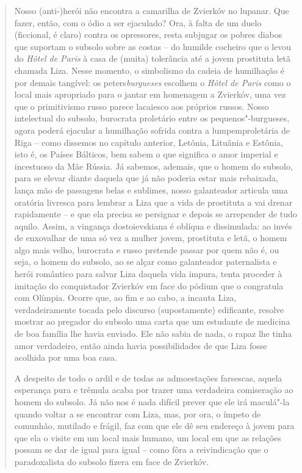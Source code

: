 {\begin{quote}
Nosso (anti-)herói não encontra a camarilha de Zvierkóv no lupanar. Que
fazer, então, com o ódio a ser ejaculado? Ora, à falta de um duelo
(ficcional, é claro) contra os opressores, resta subjugar os pobres
diabos que suportam o subsolo sobre as costas -- do humilde cocheiro que
o levou do \emph{Hôtel de Paris} à casa de (muita) tolerância até a
jovem prostituta letã chamada Liza. Nesse momento, o simbolismo da
cadeia de humilhação é por demais tangível: os peters\emph{burgueses}
escolhem o \emph{Hôtel de Paris} como o local mais apropriado para o
jantar em homenagem a Zvierkóv, uma vez que o primitivismo russo parece
lacaiesco aos próprios russos. Nosso intelectual do subsolo, burocrata
proletário entre os pequenos"-burgueses, agora poderá ejacular a
humilhação sofrida contra a lumpemproletária de Riga -- como dissemos no
capítulo anterior, Letônia, Lituânia e Estônia, isto é, os Países
Bálticos, bem sabem o que significa o amor imperial e incestuoso da Mãe
Rússia. Já sabemos, ademais, que o homem do subsolo, para se elevar
diante daquela que já não poderia estar mais rebaixada, lança mão de
passagens belas e sublimes, nosso galanteador articula uma oratória
livresca para lembrar a Liza que a vida de prostituta a vai drenar
rapidamente -- e que ela precisa se persignar e depois se arrepender de
tudo aquilo. Assim, a vingança dostoievskiana é oblíqua e dissimulada:
ao invés de enxovalhar de uma só vez a mulher jovem, prostituta e letã,
o homem algo mais velho, burocrata e russo pretende passar por quem não
é, ou seja, o homem do subsolo, ao se alçar como galanteador
paternalista e herói romântico para salvar Liza daquela vida impura,
tenta proceder à imitação do conquistador Zvierkóv em face do pódium que
o congratula com Olímpia. Ocorre que, ao fim e ao cabo, a incauta Liza,
verdadeiramente tocada pelo discurso (supostamente) edificante, resolve
mostrar ao pregador do subsolo uma carta que um estudante de medicina de
boa família lhe havia enviado. Ele não sabia de nada, o rapaz lhe tinha
amor verdadeiro, então ainda havia possibilidades de que Liza fosse
acolhida por uma boa casa.

A despeito de todo o ardil e de todas as admoestações farsescas, aquela
esperança pura e trêmula acaba por trazer uma verdadeira comiseração ao
homem do subsolo. Já não nos é nada difícil prever que ele irá maculá"-la
quando voltar a se encontrar com Liza, mas, por ora, o ímpeto de
comunhão, mutilado e frágil, faz com que ele dê seu endereço à jovem
para que ela o visite em um local mais humano, um local em que as
relações possam se dar de igual para igual -- como fôra a reivindicação
que o paradoxalista do subsolo fizera em face de Zvierkóv.


\end{quote}}
